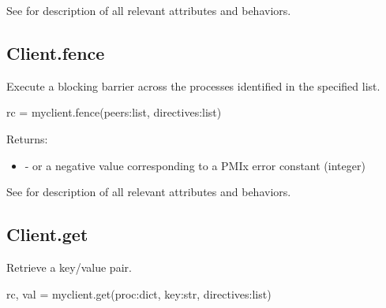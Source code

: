 See  for description of all relevant attributes and behaviors.


\subsection{Client.fence}

\summary

Execute a blocking barrier across the processes identified in the specified list.

\format

\pyspecificstart
\begin{codepar}
rc = myclient.fence(peers:list, directives:list)
\end{codepar}
\pyspecificend

\begin{arglist}
\end{arglist}

Returns:

\begin{itemize}
    \item {} -  or a negative value corresponding to a PMIx error constant (integer)
\end{itemize}

See  for description of all relevant attributes and behaviors.


\subsection{Client.get}

\summary

Retrieve a key/value pair.

\format

\pyspecificstart
\begin{codepar}
rc, val = myclient.get(proc:dict, key:str, directives:list)
\end{codepar}
\pyspecificend

\begin{arglist}
\end{arglist}

